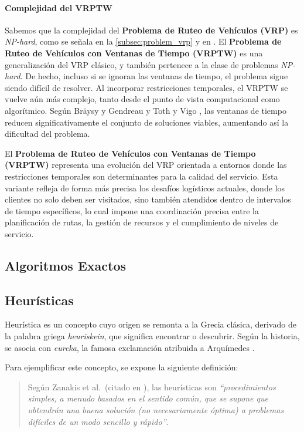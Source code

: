 \documentclass[12pt,titlepage,twoside,openright]{book}
\begin{document}
\paragraph{Complejidad del VRPTW}

Sabemos que la complejidad del \textbf{Problema de Ruteo de Vehículos (VRP)} es \textit{NP-hard}, como se señala en la \autoref{subsec:problem_vrp} y en \citep{laporte1987}. El \textbf{Problema de Ruteo de Vehículos con Ventanas de Tiempo (VRPTW)} es una generalización del VRP clásico, y también pertenece a la clase de problemas \textit{NP-hard}. De hecho, incluso si se ignoran las ventanas de tiempo, el problema sigue siendo difícil de resolver. Al incorporar restricciones temporales, el VRPTW se vuelve aún más complejo, tanto desde el punto de vista computacional como algorítmico. Según Bräysy y Gendreau \citep{braysy2005} y Toth y Vigo \citep{toth2014}, las ventanas de tiempo reducen significativamente el conjunto de soluciones viables, aumentando así la dificultad del problema.


El \textbf{Problema de Ruteo de Vehículos con Ventanas de Tiempo (VRPTW)} representa una evolución del VRP orientada a entornos donde las restricciones temporales son determinantes para la calidad del servicio. Esta variante refleja de forma más precisa los desafíos logísticos actuales, donde los clientes no solo deben ser visitados, sino también atendidos dentro de intervalos de tiempo específicos, lo cual impone una coordinación precisa entre la planificación de rutas, la gestión de recursos y el cumplimiento de niveles de servicio.

\subsection{Algoritmos Exactos} 

\subsection{Heurísticas}

Heurística es un concepto cuyo origen se remonta a la Grecia clásica, derivado de la palabra griega \textit{heuriskein}, que significa encontrar o descubrir. Según la historia, se asocia con \textit{eureka}, la famosa exclamación atribuida a Arquímedes \citep{antonioSuarez2014}.

Para ejemplificar este concepto, se expone la siguiente definición:

\begin{quote}
	Según Zanakis et al.\ (citado en \citep{duarte2007metaheuristicas}), las heurísticas son \textit{``procedimientos simples, a menudo basados en el sentido común, que se supone que obtendrán una buena solución (no necesariamente óptima) a problemas difíciles de un modo sencillo y rápido''}.
\end{quote}
\end{document}
